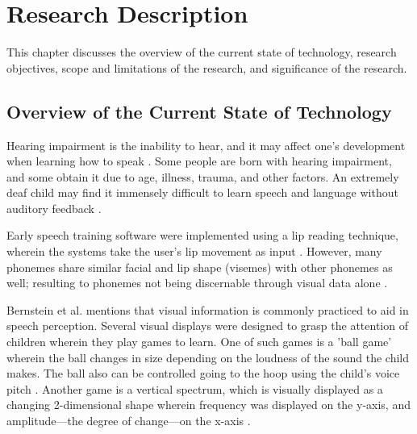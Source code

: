 \chapter{Research Description}
\label{sec:researchdesc}

This chapter discusses the overview of the current state of technology, research objectives, scope and limitations of the research, and significance of the research.

\section{Overview of the Current State of Technology}
\label{sec:overview}

Hearing impairment is the inability to hear, and it may affect one's development when learning how to speak \cite{lasak:2014:HL}. Some people are born with hearing impairment, and some obtain it due to age, illness, trauma, and other factors. An extremely deaf child may find it immensely difficult to learn speech and language without auditory feedback \cite{bernstein:1988:STA}.

\begin{comment}
Throughout the years, man has tried to find ways to help the hearing-handicapped learn how to speak properly \cite{oyer:1976:CHH}. Oyer \citeyear{oyer:1976:CHH} states that there was a time when hearing-handicapped were considered unfit to hold citizenship. James Pickett, a professor of speech communication research says "I believe that large improvements in the lives of deaf persons depends on making large improvements in their speech communication" \cite{connor:1971:SDC}. Pickett also states that in the late 19th century, research began for helping the Deaf communicate \cite{connor:1971:SDC}.

One problem of a hearing-impaired student is the lack of access to speech training aids outside of therapy \cite{bernstein:1988:STA}. Extensive practice is required for the student to progress \cite{bernstein:1988:STA}.
\end{comment}

Early speech training software were implemented using a lip reading technique, wherein the systems take the user's lip movement as input \cite{heracleous:2010:CSA}. However, many phonemes share similar facial and lip shape (visemes) with other phonemes as well; resulting to phonemes not being discernable through visual data alone \cite{heracleous:2010:CSA}.

Bernstein et al. \citeyear{bernstein:1988:STA} mentions that visual information is commonly practiced to aid in speech perception. Several visual displays were designed to grasp the attention of children wherein they play games to learn. One of such games is a 'ball game' wherein the ball changes in size depending on the loudness of the sound the child makes. The ball also can be controlled going to the hoop using the child's voice pitch \cite{bernstein:1988:STA}. Another game is a vertical spectrum, which is visually displayed as a changing 2-dimensional shape wherein frequency was displayed on the y-axis, and amplitude---the degree of change---on the x-axis \cite{bernstein:1988:STA}.

